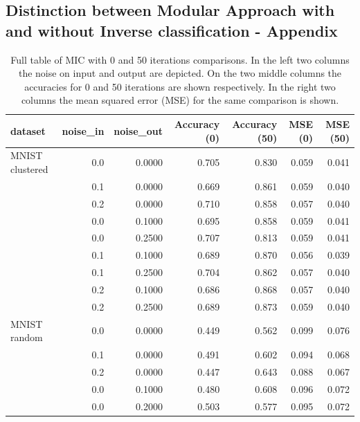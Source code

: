 \documentclass{article}
\begin{document}
\subsection{Distinction between Modular Approach with and without Inverse classification - Appendix}
\label{subsec:MIC_vs_modular_appendix}


\begin{table}[!htb]
	\centering
	\caption{Full table of MIC with 0 and 50 iterations comparisons. In the left two columns the noise on input and output are depicted. On the two middle columns the accuracies for 0 and 50 iterations are shown respectively. In the right two columns the mean squared error (MSE) for the same comparison is shown.}
	\begin{tabular}{l||rr|rr|rr}
		\toprule
		dataset & noise\_in &  noise\_out &  Accuracy (0) &  Accuracy (50) &  MSE (0) &  MSE (50) \\
		\midrule
		MNIST clustered & 0.0 &     0.0000 &         0.705 &          0.830 &    0.059 &     0.041 \\
		& 0.1 &     0.0000 &         0.669 &          0.861 &    0.059 &     0.040 \\
		& 0.2 &     0.0000 &         0.710 &          0.858 &    0.057 &     0.040 \\
		& 0.0 &     0.1000 &         0.695 &          0.858 &    0.059 &     0.041 \\
		& 0.0 &     0.2500 &         0.707 &          0.813 &    0.059 &     0.041 \\
		& 0.1 &     0.1000 &         0.689 &          0.870 &    0.056 &     0.039 \\
		& 0.1 &     0.2500 &         0.704 &          0.862 &    0.057 &     0.040 \\
		& 0.2 &     0.1000 &         0.686 &          0.868 &    0.057 &     0.040 \\
		& 0.2 &     0.2500 &         0.689 &          0.873 &    0.059 &     0.040 \\
		\midrule
		MNIST random & 0.0 &     0.0000 &         0.449 &          0.562 &    0.099 &     0.076 \\
		& 0.1 &     0.0000 &         0.491 &          0.602 &    0.094 &     0.068 \\
		& 0.2 &     0.0000 &         0.447 &          0.643 &    0.088 &     0.067 \\
		& 0.0 &     0.1000 &         0.480 &          0.608 &    0.096 &     0.072 \\
		& 0.0 &     0.2000 &         0.503 &          0.577 &    0.095 &     0.072 \\

\end{tabular}
\end{table}
\end{document}
